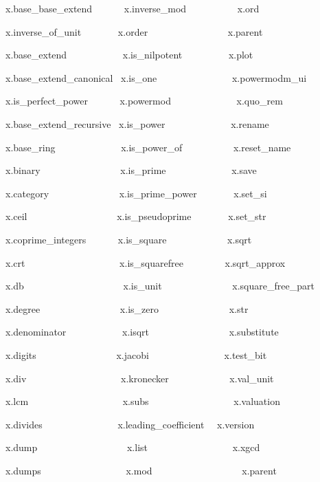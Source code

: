 \documentclass[12pt,oneside]{book}
\begin{document}
x.base\_base\_extend \ \ \ \ \ \ x.inverse\_mod
\ \ \ \ \ \ \ \ \ \ x.ord

x.inverse\_of\_unit \ \ \ \ \ \ \ x.order
\ \ \ \ \ \ \ \ \ \ \ \ \ \ \ \ x.parent

x.base\_extend \ \ \ \ \ \ \ \ \ \ \ x.is\_nilpotent
\ \ \ \ \ \ \ \ \ x.plot

x.base\_extend\_canonical \ x.is\_one
\ \ \ \ \ \ \ \ \ \ \ \ \ \ \ x.powermodm\_ui

x.is\_perfect\_power \ \ \ \ \ \ x.powermod
\ \ \ \ \ \ \ \ \ \ \ \ \ x.quo\_rem

x.base\_extend\_recursive \ x.is\_power
\ \ \ \ \ \ \ \ \ \ \ \ \ x.rename

x.base\_ring \ \ \ \ \ \ \ \ \ \ \ \ \ x.is\_power\_of
\ \ \ \ \ \ \ \ \ \ x.reset\_name

x.binary \ \ \ \ \ \ \ \ \ \ \ \ \ \ \ \ x.is\_prime
\ \ \ \ \ \ \ \ \ \ \ \ \ x.save

x.category \ \ \ \ \ \ \ \ \ \ \ \ \ \ x.is\_prime\_power
\ \ \ \ \ \ \ x.set\_si

x.ceil \ \ \ \ \ \ \ \ \ \ \ \ \ \ \ \ \ \ x.is\_pseudoprime
\ \ \ \ \ \ \ x.set\_str

x.coprime\_integers \ \ \ \ \ \ x.is\_square
\ \ \ \ \ \ \ \ \ \ \ \ x.sqrt

x.crt \ \ \ \ \ \ \ \ \ \ \ \ \ \ \ \ \ \ \ x.is\_squarefree
\ \ \ \ \ \ \ \ x.sqrt\_approx

x.db \ \ \ \ \ \ \ \ \ \ \ \ \ \ \ \ \ \ \ \ x.is\_unit
\ \ \ \ \ \ \ \ \ \ \ \ \ \ x.square\_free\_part

x.degree \ \ \ \ \ \ \ \ \ \ \ \ \ \ \ \ x.is\_zero
\ \ \ \ \ \ \ \ \ \ \ \ \ \ x.str

x.denominator \ \ \ \ \ \ \ \ \ \ \ x.isqrt
\ \ \ \ \ \ \ \ \ \ \ \ \ \ \ \ x.substitute

x.digits \ \ \ \ \ \ \ \ \ \ \ \ \ \ \ \ x.jacobi
\ \ \ \ \ \ \ \ \ \ \ \ \ \ \ x.test\_bit

x.div \ \ \ \ \ \ \ \ \ \ \ \ \ \ \ \ \ \ \ x.kronecker
\ \ \ \ \ \ \ \ \ \ \ \ x.val\_unit

x.lcm \ \ \ \ \ \ \ \ \ \ \ \ \ \ \ \ \ \ \ x.subs
\ \ \ \ \ \ \ \ \ \ \ \ \ \ \ \ \ x.valuation

x.divides \ \ \ \ \ \ \ \ \ \ \ \ \ \ \ x.leading\_coefficient
\ \ x.version

x.dump \ \ \ \ \ \ \ \ \ \ \ \ \ \ \ \ \ \ x.list
\ \ \ \ \ \ \ \ \ \ \ \ \ \ \ \ \ x.xgcd

x.dumps \ \ \ \ \ \ \ \ \ \ \ \ \ \ \ \ \ x.mod
\ \ \ \ \ \ \ \ \ \ \ \ \ \ \ \ \ \ x.parent
\end{document}

